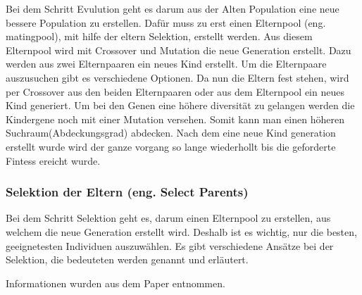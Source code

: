 Bei dem Schritt Evulution geht es darum aus der Alten Population eine neue bessere Population zu erstellen. Dafür muss zu erst einen Elternpool (eng. matingpool), mit hilfe der eltern Selektion, erstellt werden. Aus diesem Elternpool wird mit Crossover und Mutation die neue Generation erstellt. 
Dazu  werden aus zwei Elternpaaren ein neues Kind erstellt.
Um die Elternpaare auszusuchen gibt es verschiedene Optionen. Da nun die Eltern fest stehen, wird per Crossover aus den beiden Elternpaaren oder aus dem Elternpool ein neues Kind generiert. Um bei den Genen eine höhere diversität zu gelangen werden die Kindergene noch mit einer Mutation versehen. Somit kann man einen höheren Suchraum(Abdeckungsgrad) abdecken. Nach dem eine neue Kind generation erstellt wurde wird der ganze vorgang so lange wiederhollt bis die geforderte Fintess ereicht wurde.

\fi

\subsubsection{Selektion der Eltern (eng. Select Parents)}
Bei dem Schritt Selektion geht es, darum einen Elternpool zu erstellen, aus welchem die neue Generation erstellt wird. Deshalb ist es wichtig, nur die besten, geeignetesten Individuen auszuwählen. Es gibt verschiedene Ansätze bei der Selektion, die bedeuteten werden genannt und erläutert.

Informationen wurden aus dem Paper \cite{shukla15} entnommen.


